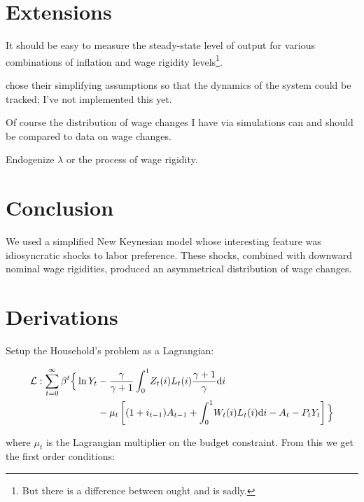 \documentclass[12pt,a4paper]{scrartcl}            %
\begin{document}
\section{Extensions}
\label{sec:extensions}

It should be easy to measure the steady-state level of output for various combinations of inflation and wage rigidity levels\footnote{But there is a difference between ought and is sadly.}.

\cite{daly_hobijn_2013} chose their simplifying assumptions so that the dynamics of the system could be tracked;
I've not implemented this yet.

Of course the distribution of wage changes I have via simulations can and should be compared to data on wage changes.

Endogenize $\lambda$ or the process of wage rigidity.

\section{Conclusion}

We used a simplified New Keynesian model whose interesting feature was idiosyncratic shocks to labor preference.
These shocks, combined with downward nominal wage rigidities, produced an asymmetrical distribution of wage changes.

\newpage



\newpage
\appendix

\section{Derivations}

Setup the Household's problem as a Lagrangian:

\begin{equation}
    \label{eqa:houehold}
    \begin{split}
        \mathcal{L} : \sum_{t=0}^{\infty} \beta^t \Big\{ \ln Y_t & - \frac{\gamma}{\gamma + 1} \int_{0}^{1} \! Z_t(i)L_t(i) \frac{\gamma + 1}{\gamma} \mathrm{d}i \\
                                                           & - \mu_t \left[ (1 + i_{t-1})A_{t-1} + \int_{0}^{1} \! W_t(i)L_t(i) \mathrm{d}i  - A_t - P_tY_t\right] \Big\}
    \end{split}
\end{equation}

where $\mu_t$ is the Lagrangian multiplier on the budget constraint.
From this we get the first order conditions:
\end{document}
